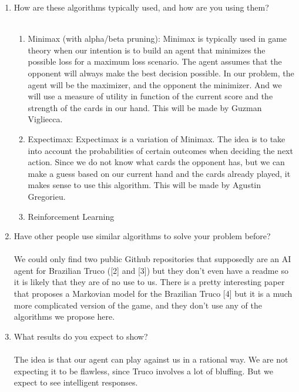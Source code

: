 \documentclass{article}
\begin{document}
\begin{enumerate}
\item How are these algorithms typically used, and how are you using them?
\\\\
\begin{enumerate}
	\item Minimax (with alpha/beta pruning): Minimax is typically used in game theory when our intention is to build an agent that minimizes the possible loss for a maximum loss scenario. The agent assumes that the opponent will always make the best decision possible. In our problem, the agent will be the maximizer, and the opponent the minimizer. And we will use a measure of utility in function of the current score and the strength of the cards in our hand. This will be made by Guzman Vigliecca.
	\item Expectimax: Expectimax is a variation of Minimax. The idea is to take into account the probabilities of certain outcomes when deciding the next action. Since we do not know what cards the opponent has, but we can make a guess based on our current hand and the cards already played, it makes sense to use this algorithm. This will be made by Agustin Gregorieu.
	\item Reinforcement Learning
\end{enumerate}

\item Have other people use similar algorithms to solve your problem before?
\\\\
We could only find two public Github repositories that supposedly are an AI agent for Brazilian Truco ([2] and [3]) but they don’t even have a readme so it is likely that they are of no use to us. There is a pretty interesting paper that proposes a Markovian model for the Brazilian Truco [4] but it is a much more complicated version of the game, and they don’t use any of the algorithms we propose here.

\item What results do you expect to show?
\\\\
The idea is that our agent can play against us in a rational way. We are not expecting it to be flawless, since Truco involves a lot of bluffing. But we expect to see intelligent responses.                                                                                                                        


\end{enumerate}
\end{document}
